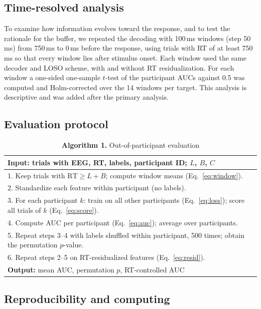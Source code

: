 \documentclass[11pt,a4paper]{article}
\begin{document}
\subsection{Time-resolved analysis}

To examine how information evolves toward the response, and to test the rationale for the buffer, we repeated the decoding with 100\,ms windows (step 50\,ms) from 750\,ms to 0\,ms before the response, using trials with RT of at least 750\,ms so that every window lies after stimulus onset. Each window used the same decoder and LOSO scheme, with and without RT residualization. For each window a one-sided one-sample $t$-test of the participant AUCs against 0.5 was computed and Holm-corrected over the 14 windows per target. This analysis is descriptive and was added after the primary analysis.

\subsection{Evaluation protocol}

\begin{table}[ht]
\centering
\caption*{\textbf{Algorithm 1.} Out-of-participant evaluation}
\small
\begin{tabularx}{\textwidth}{@{}X@{}}
\toprule
\textbf{Input:} trials with EEG, RT, labels, participant ID; $L$, $B$, $C$\\
\midrule
1. Keep trials with $\mathrm{RT}\geq L+B$; compute window means (Eq.~\ref{eq:window}).\\
2. Standardize each feature within participant (no labels).\\
3. For each participant $k$: train on all other participants (Eq.~\ref{eq:loss}); score all trials of $k$ (Eq.~\ref{eq:score}).\\
4. Compute AUC per participant (Eq.~\ref{eq:auc}); average over participants.\\
5. Repeat steps 3--4 with labels shuffled within participant, 500 times; obtain the permutation $p$-value.\\
6. Repeat steps 2--5 on RT-residualized features (Eq.~\ref{eq:resid}).\\
\midrule
\textbf{Output:} mean AUC, permutation $p$, RT-controlled AUC\\
\bottomrule
\end{tabularx}
\end{table}

\subsection{Reproducibility and computing}
\end{document}

